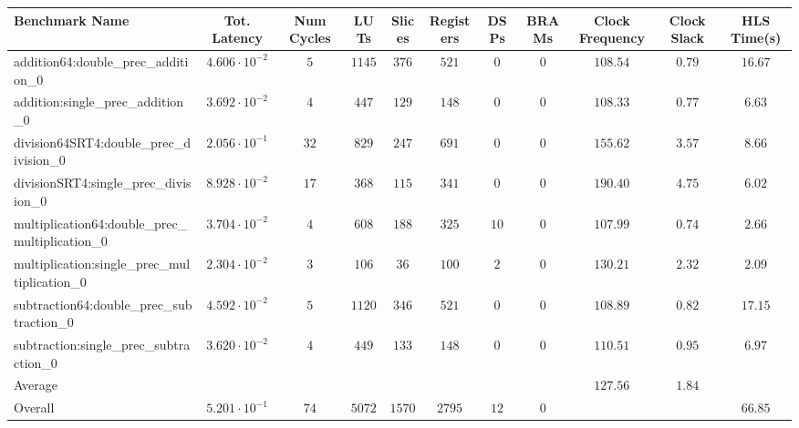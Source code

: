 \begin{tabular}{|l|c|c|c|c|c|c|c|c|c|c|}
\hline
Benchmark Name                                   & Tot. Latency            & Num Cycles & LUTs     & Slices   & Registers & DSPs   & BRAMs & Clock Frequency & Clock Slack & HLS Time(s) \\
\hline
addition64:double\_prec\_addition\_0             & $ 4.606 \cdot 10^{-2} $ & $ 5      $ & $ 1145 $ & $ 376  $ & $ 521   $ & $ 0  $ & $ 0 $ & $ 108.54      $ & $ 0.79    $ & $ 16.67   $ \\
addition:single\_prec\_addition\_0               & $ 3.692 \cdot 10^{-2} $ & $ 4      $ & $ 447  $ & $ 129  $ & $ 148   $ & $ 0  $ & $ 0 $ & $ 108.33      $ & $ 0.77    $ & $ 6.63    $ \\
division64SRT4:double\_prec\_division\_0         & $ 2.056 \cdot 10^{-1} $ & $ 32     $ & $ 829  $ & $ 247  $ & $ 691   $ & $ 0  $ & $ 0 $ & $ 155.62      $ & $ 3.57    $ & $ 8.66    $ \\
divisionSRT4:single\_prec\_division\_0           & $ 8.928 \cdot 10^{-2} $ & $ 17     $ & $ 368  $ & $ 115  $ & $ 341   $ & $ 0  $ & $ 0 $ & $ 190.40      $ & $ 4.75    $ & $ 6.02    $ \\
multiplication64:double\_prec\_multiplication\_0 & $ 3.704 \cdot 10^{-2} $ & $ 4      $ & $ 608  $ & $ 188  $ & $ 325   $ & $ 10 $ & $ 0 $ & $ 107.99      $ & $ 0.74    $ & $ 2.66    $ \\
multiplication:single\_prec\_multiplication\_0   & $ 2.304 \cdot 10^{-2} $ & $ 3      $ & $ 106  $ & $ 36   $ & $ 100   $ & $ 2  $ & $ 0 $ & $ 130.21      $ & $ 2.32    $ & $ 2.09    $ \\
subtraction64:double\_prec\_subtraction\_0       & $ 4.592 \cdot 10^{-2} $ & $ 5      $ & $ 1120 $ & $ 346  $ & $ 521   $ & $ 0  $ & $ 0 $ & $ 108.89      $ & $ 0.82    $ & $ 17.15   $ \\
subtraction:single\_prec\_subtraction\_0         & $ 3.620 \cdot 10^{-2} $ & $ 4      $ & $ 449  $ & $ 133  $ & $ 148   $ & $ 0  $ & $ 0 $ & $ 110.51      $ & $ 0.95    $ & $ 6.97    $ \\
\hline
Average                                          & $                     $ & $        $ & $      $ & $      $ & $       $ & $    $ & $   $ & $ 127.56      $ & $ 1.84    $ & $         $ \\
\hline
Overall                                          & $ 5.201 \cdot 10^{-1} $ & $ 74     $ & $ 5072 $ & $ 1570 $ & $ 2795  $ & $ 12 $ & $ 0 $ & $             $ & $         $ & $ 66.85   $ \\
\hline
\end{tabular}
